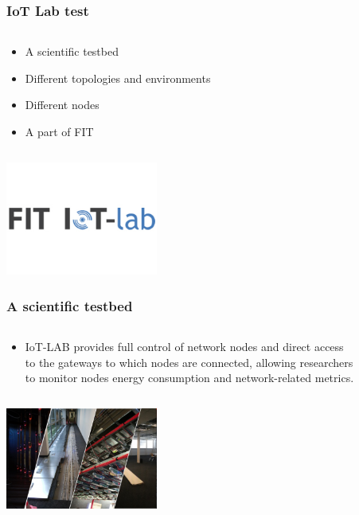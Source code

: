 \documentclass{beamer}
\begin{document}
\begin{frame}
	\frametitle{IoT Lab test}
	\begin{columns}[c]
		\begin{column}{30cm}
			\vspace{.1cm}
			\begin{itemize}
				\justifying
				\item A scientific testbed
				\item Different topologies and environments
				\item Different nodes
				\item A part of FIT
			\end{itemize}
		\end{column}
	\end{columns}
	\vspace{.5cm}
	\hspace*{5.5cm} \includegraphics[width=5cm]{figs/fit-iot-lab.jpg}
\end{frame}

\begin{frame}
	\frametitle{A scientific testbed}
	\begin{columns}[c]
		\begin{column}{30cm}
			\vspace{.1cm}
			\begin{itemize}
				\justifying
				\item IoT-LAB provides full control of network nodes and direct access\\
				to the gateways to which nodes are connected, allowing researchers\\
				to monitor nodes energy consumption and network-related metrics.
			\end{itemize}
		\end{column}
	\end{columns}
	\vspace{.5cm}
	\hspace*{5.5cm} \includegraphics[width=5cm]{figs/iot-lab-1.png}
\end{frame}
\end{document}
